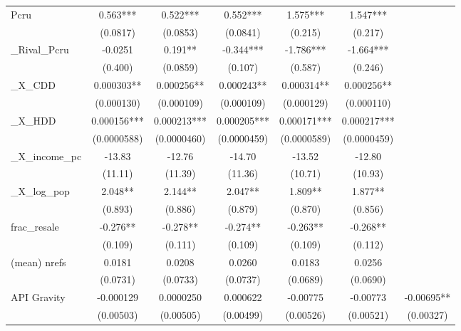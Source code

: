 {
\def\sym#1{\ifmmode^{#1}\else\(^{#1}\)\fi}
\begin{tabular}{l*{6}{c}}
\toprule
\midrule
Pcru            &    0.563***&    0.522***&    0.552***&    1.575***&    1.547***&            \\
                & (0.0817)   & (0.0853)   & (0.0841)   &  (0.215)   &  (0.217)   &            \\
\addlinespace
\_Rival\_Pcru     &  -0.0251   &    0.191** &   -0.344***&   -1.786***&   -1.664***&            \\
                &  (0.400)   & (0.0859)   &  (0.107)   &  (0.587)   &  (0.246)   &            \\
\addlinespace
\_X\_CDD          & 0.000303** & 0.000256** & 0.000243** & 0.000314** & 0.000256** &            \\
                &(0.000130)   &(0.000109)   &(0.000109)   &(0.000129)   &(0.000110)   &            \\
\addlinespace
\_X\_HDD          & 0.000156***& 0.000213***& 0.000205***& 0.000171***& 0.000217***&            \\
                &(0.0000588)   &(0.0000460)   &(0.0000459)   &(0.0000589)   &(0.0000459)   &            \\
\addlinespace
\_X\_income\_pc    &   -13.83   &   -12.76   &   -14.70   &   -13.52   &   -12.80   &            \\
                &  (11.11)   &  (11.39)   &  (11.36)   &  (10.71)   &  (10.93)   &            \\
\addlinespace
\_X\_log\_pop      &    2.048** &    2.144** &    2.047** &    1.809** &    1.877** &            \\
                &  (0.893)   &  (0.886)   &  (0.879)   &  (0.870)   &  (0.856)   &            \\
\addlinespace
frac\_resale     &   -0.276** &   -0.278** &   -0.274** &   -0.263** &   -0.268** &            \\
                &  (0.109)   &  (0.111)   &  (0.109)   &  (0.109)   &  (0.112)   &            \\
\addlinespace
(mean) nrefs    &   0.0181   &   0.0208   &   0.0260   &   0.0183   &   0.0256   &            \\
                & (0.0731)   & (0.0733)   & (0.0737)   & (0.0689)   & (0.0690)   &            \\
\addlinespace
API Gravity     &-0.000129   &0.0000250   & 0.000622   & -0.00775   & -0.00773   & -0.00695** \\
                &(0.00503)   &(0.00505)   &(0.00499)   &(0.00526)   &(0.00521)   &(0.00327)   \\

\end{tabular}}
